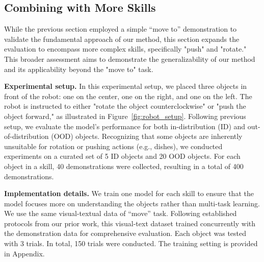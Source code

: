 \subsection{Combining with More Skills}
\label{sec:skills}
While the previous section employed a simple ``move to'' demonstration to validate the fundamental approach of our method, this section expands the evaluation to encompass more complex skills, specifically "push" and "rotate." This broader assessment aims to demonstrate the generalizability of our method and its applicability beyond the "move to" task.
\begin{table}[t]
\centering
\vspace{0.1cm}
\caption{\textbf{Experimental Results for rotate and push skills.} Our proposed ObjectVLA achieves high performance on both 5 in-distribution objects and 20 out-of-distribution objects. Each object is evaluated with three trials. We report the number of success trials.}
\label{tab:rotate}
\vspace{-0.5cm}
\end{table}

\noindent
\textbf{Experimental setup.} In this experimental setup, we placed three objects in front of the robot: one on the center, one on the right, and one on the left. The robot is instructed to either "rotate the object counterclockwise" or "push the object forward," as illustrated in Figure~\ref{fig:robot_setup}. Following previous setup, we evaluate the model's performance for both in-distribution (ID) and out-of-distribution (OOD) objects. Recognizing that some objects are inherently unsuitable for rotation or pushing actions (e.g., dishes), we conducted experiments on a curated set of 5 ID objects and 20 OOD objects. For each object in a skill, 40 demonstrations were collected, resulting in a total of 400 demonstrations.

\noindent
\textbf{Implementation details.} We train one model for each skill to ensure that the model focuses more on understanding the objects rather than multi-task learning. 
We use the same visual-textual data of ``move'' task. Following established protocols from our prior work, this visual-text dataset trained concurrently with the demonstration data for comprehensive evaluation. Each object was tested with 3 trials. In total, 150 trials were conducted. The training setting is provided in Appendix.

